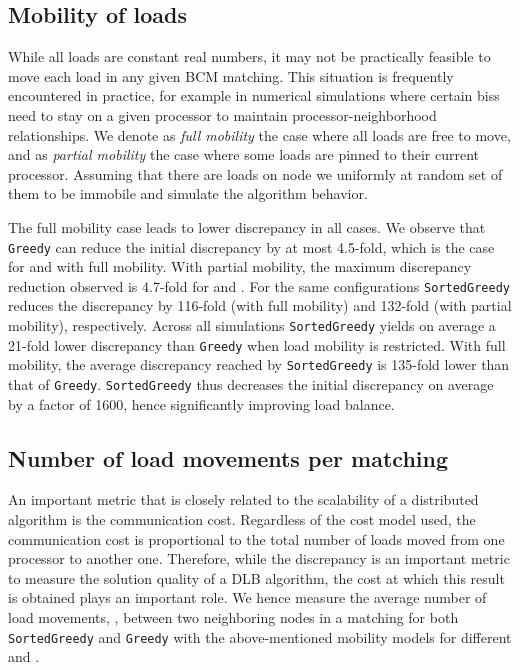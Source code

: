 \documentclass[12pt,psfig,a4]{article}
\newcommand{\sg}{\texttt{SortedGreedy}}
\newcommand{\gr}{\texttt{Greedy}}
\theoremstyle{plain}
\begin{document}
\subsection{Mobility of loads}

While all loads are constant real numbers, it may not be practically feasible to move each load in any given BCM matching. This situation is frequently encountered in practice, for example in numerical simulations where certain biss need to stay on a given processor to maintain processor-neighborhood relationships. We denote as \textit{full mobility} the case where all loads are free to move, and as \textit{partial mobility} the case where some loads are pinned to their current processor. Assuming that there are  loads on node  we uniformly at random set  of them to be immobile and simulate the algorithm behavior.

The full mobility case leads to lower discrepancy in all cases. We observe that \gr{} can reduce the initial discrepancy by at most 4.5-fold, which is the case for  and  with full mobility. With partial mobility, the maximum discrepancy reduction observed is 4.7-fold for  and . For the same configurations \sg{} reduces the discrepancy by 116-fold (with full mobility) and 132-fold (with partial mobility), respectively. Across all simulations \sg{} yields on average a 21-fold lower discrepancy than \gr{} when load mobility is restricted. With full mobility, the average discrepancy reached by \sg{} is 135-fold lower than that of \gr{}. \sg{} thus decreases the initial discrepancy on average by a factor of 1600, hence significantly improving load balance.

\subsection{Number of load movements per matching}

An important metric that is closely related to the scalability of a distributed algorithm is the communication cost. Regardless of the cost model used, the communication cost is proportional to the total number of loads moved from one processor to another one. Therefore, while the discrepancy is an important metric to measure the solution quality of a DLB algorithm, the cost at which this result is obtained plays an important role. We hence measure the average number of load movements, , between two neighboring nodes in a matching for both \sg{} and \gr{} with the above-mentioned mobility models for different  and .
\end{document}
